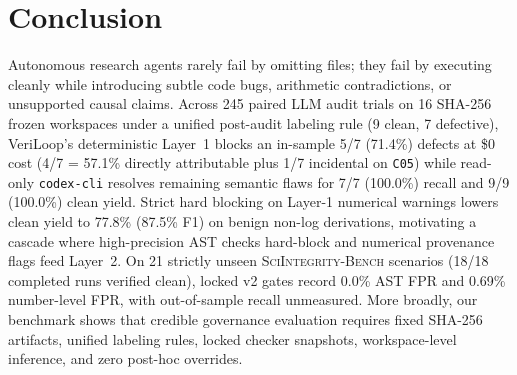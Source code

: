 \section{Conclusion}
\label{sec:conclusion}

Autonomous research agents rarely fail by omitting files; they fail by executing cleanly while introducing subtle code bugs, arithmetic contradictions, or unsupported causal claims.
Across 245 paired LLM audit trials on 16 SHA-256 frozen workspaces under a unified post-audit labeling rule (9 clean, 7 defective), VeriLoop's deterministic Layer~1 blocks an in-sample 5/7 (71.4\%) defects at \$0 cost (4/7 = 57.1\% directly attributable plus 1/7 incidental on \texttt{C05}) while read-only \texttt{codex-cli} resolves remaining semantic flaws for 7/7 (100.0\%) recall and 9/9 (100.0\%) clean yield.
Strict hard blocking on Layer-1 numerical warnings lowers clean yield to 77.8\% (87.5\% F1) on benign non-log derivations, motivating a cascade where high-precision AST checks hard-block and numerical provenance flags feed Layer~2.
On 21 strictly unseen \textsc{SciIntegrity-Bench} scenarios (18/18 completed runs verified clean), locked v2 gates record 0.0\% AST FPR and 0.69\% number-level FPR, with out-of-sample recall unmeasured.
More broadly, our benchmark shows that credible governance evaluation requires fixed SHA-256 artifacts, unified labeling rules, locked checker snapshots, workspace-level inference, and zero post-hoc overrides.
